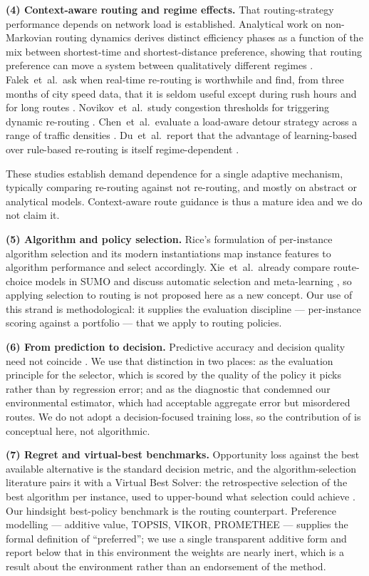\documentclass[10pt,a4paper]{article}
\begin{document}
\textbf{(4) Context-aware routing and regime effects.} That routing-strategy performance depends on network load is established. Analytical work on non-Markovian routing dynamics derives distinct efficiency phases as a function of the mix between shortest-time and shortest-distance preference, showing that routing preference can move a system between qualitatively different regimes \cite{R41}. Falek~et~al.\ ask when real-time re-routing is worthwhile and find, from three months of city speed data, that it is seldom useful except during rush hours and for long routes \cite{R42}. Novikov~et~al.\ study congestion thresholds for triggering dynamic re-routing \cite{R43}. Chen~et~al.\ evaluate a load-aware detour strategy across a range of traffic densities \cite{R44}. Du~et~al.\ report that the advantage of learning-based over rule-based re-routing is itself regime-dependent \cite{R45}.

These studies establish demand dependence for a single adaptive mechanism, typically comparing re-routing against not re-routing, and mostly on abstract or analytical models. Context-aware route guidance is thus a mature idea and we do not claim it.

\textbf{(5) Algorithm and policy selection.} Rice's formulation of per-instance algorithm selection \cite{R08} and its modern instantiations \cite{R09,R10} map instance features to algorithm performance and select accordingly. Xie~et~al.\ already compare route-choice models in SUMO and discuss automatic selection and meta-learning \cite{R38}, so applying selection to routing is not proposed here as a new concept. Our use of this strand is methodological: it supplies the evaluation discipline --- per-instance scoring against a portfolio --- that we apply to routing policies.

\textbf{(6) From prediction to decision.} Predictive accuracy and decision quality need not coincide \cite{R11}. We use that distinction in two places: as the evaluation principle for the selector, which is scored by the quality of the policy it picks rather than by regression error; and as the diagnostic that condemned our environmental estimator, which had acceptable aggregate error but misordered routes. We do not adopt a decision-focused training loss, so the contribution of \cite{R11} is conceptual here, not algorithmic.

\textbf{(7) Regret and virtual-best benchmarks.} Opportunity loss against the best available alternative \cite{R24} is the standard decision metric, and the algorithm-selection literature pairs it with a Virtual Best Solver: the retrospective selection of the best algorithm per instance, used to upper-bound what selection could achieve \cite{R09}. Our hindsight best-policy benchmark is the routing counterpart. Preference modelling --- additive value, TOPSIS, VIKOR, PROMETHEE \cite{R15,R12,R13,R14} --- supplies the formal definition of ``preferred''; we use a single transparent additive form and report below that in this environment the weights are nearly inert, which is a result about the environment rather than an endorsement of the method.
\end{document}
